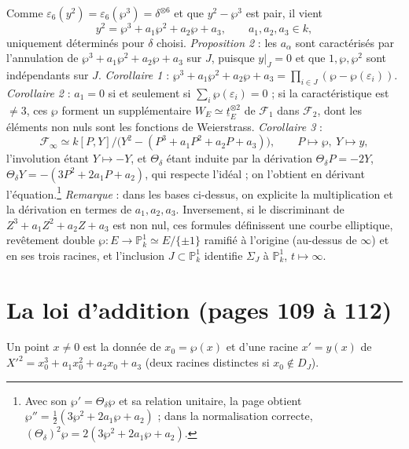\documentclass[11pt,a4paper]{article}
\begin{document}
Comme $\varepsilon_6(y^2) = \varepsilon_6(\wp^3) = \delta^{\otimes 6}$ et que $y^2
- \wp^3$ est pair, il vient
\[
y^2 = \wp^3 + a_1 \wp^2 + a_2 \wp + a_3, \qquad a_1, a_2, a_3 \in k,
\]
uniquement déterminés pour $\delta$ choisi. \emph{Proposition 2} : les $a_\alpha$
sont caractérisés par l'annulation de $\wp^3 + a_1 \wp^2 + a_2 \wp + a_3$ sur
$J$, puisque $y|_J = 0$ et que $1, \wp, \wp^2$ sont indépendants sur $J$.
\emph{Corollaire 1} : $\wp^3 + a_1\wp^2 + a_2\wp + a_3 = \prod_{i \in J} (\wp -
\wp(\varepsilon_i))$. \emph{Corollaire 2} : $a_1 = 0$ si et seulement si $\sum_i
\wp(\varepsilon_i) = 0$ ; si la caractéristique est $\neq 3$, ces $\wp$ forment
un supplémentaire $W_E \simeq \underline{t}_E^{\otimes 2}$ de $\mathcal{F}_1$
dans $\mathcal{F}_2$, dont les éléments non nuls sont les fonctions de
Weierstrass. \emph{Corollaire 3} :
\[
\mathcal{F}_\infty \simeq k[P, Y] / \bigl(Y^2 - (P^3 + a_1 P^2 + a_2 P +
a_3)\bigr), \qquad P \mapsto \wp, \ Y \mapsto y,
\]
l'involution étant $Y \mapsto -Y$, et $\Theta_\delta$ étant induite par la
dérivation $\Theta_\delta P = -2Y$, $\Theta_\delta Y = -(3P^2 + 2a_1 P + a_2)$,
qui respecte l'idéal ; on l'obtient en dérivant l'équation.\footnote{Avec son
$\wp' = \Theta_\delta \wp$ et sa relation unitaire, la page obtient $\wp'' =
\frac12(3\wp^2 + 2a_1\wp + a_2)$ ; dans la normalisation correcte,
$(\Theta_\delta)^2 \wp = 2(3\wp^2 + 2a_1\wp + a_2)$.} \emph{Remarque} : dans les
bases ci-dessus, on explicite la multiplication et la dérivation en termes de
$a_1, a_2, a_3$. Inversement, si le discriminant de $Z^3 + a_1Z^2 + a_2Z + a_3$
est non nul, ces formules définissent une courbe elliptique, revêtement double
$\wp : E \to \mathbb{P}^1_k \simeq E/\{\pm 1\}$ ramifié à l'origine (au-dessus
de $\infty$) et en ses trois racines, et l'inclusion $J \subset \mathbb{P}^1_k$
identifie $\Sigma_J$ à $\mathbb{P}^1_k$, $t \mapsto \infty$.

\section*{La loi d'addition (pages 109 à 112)}

Un point $x \neq 0$ est la donnée de $x_0 = \wp(x)$ et d'une racine $x' = y(x)$
de $X'^2 = x_0^3 + a_1x_0^2 + a_2x_0 + a_3$ (deux racines distinctes si $x_0
\notin D_J$).
\end{document}
